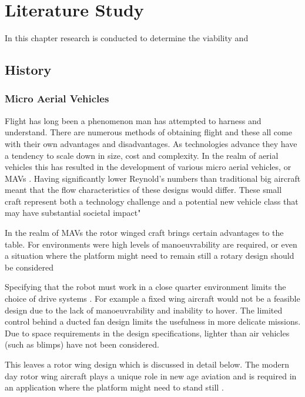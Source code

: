 \chapter{Literature Study}
In this chapter research is conducted to determine the viability and 


\section{History}
\subsection{Micro Aerial Vehicles}
Flight has long been a phenomenon man has attempted to harness and understand. There are numerous methods of obtaining flight and these all come with their own advantages and disadvantages. As technologies advance they have a tendency to scale down in size, cost and complexity. In the realm of aerial vehicles this has resulted in the development of various micro aerial vehicles, or MAVs \cite{Leishman}. Having significantly lower Reynold's numbers than traditional big aircraft meant that the flow characteristics of these designs would differ. These small craft represent both a technology challenge and a potential new vehicle class that may have substantial societal impact" \cite{NewMAV}

In the realm of MAVs the rotor winged craft brings certain advantages to the table. For environments were high levels of manoeuvrability are required, or even a situation where the platform might need to remain still a rotary design should be considered \cite{Bohorquez}


Specifying that the robot must work in a close quarter environment limits the choice of drive systems \cite{CQAR}. 
For example a fixed wing aircraft would not be a feasible design due to the lack of manoeuvrability and inability to hover. The limited control behind a ducted fan design limits the usefulness in more delicate missions. Due to space requirements in the design specifications, lighter than air vehicles (such as blimps) have not been considered.

This leaves a rotor wing design which is discussed in detail below. The modern day rotor wing aircraft plays a unique role in new age aviation \cite{Leishman} and is required in an application where the platform might need to stand still \cite{Bohorquez}. 



